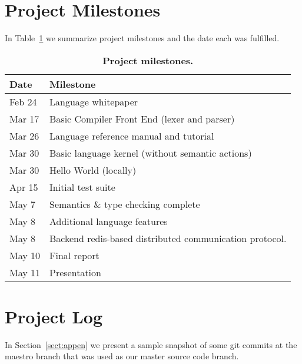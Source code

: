 \section{Project Milestones}
In Table~\ref{tab:milestones}  we summarize project milestones and the date
each was fulfilled.

\begin{table}[!h]
{%
 \begin{center}
    \begin{tabular}{ | l || l |}
    \hline
    \textbf{Date} & \textbf{Milestone}\\
    \hline
    \hline
    Feb 24 &  Language whitepaper\\ \hline
    Mar 17 &  Basic Compiler Front End (lexer and parser)\\ \hline
    Mar 26 &  Language reference manual and tutorial\\ \hline
    Mar 30 &  Basic language kernel (without semantic actions)\\ \hline
    Mar 30 &  Hello World (locally)\\ \hline
    Apr 15 &  Initial test suite \\ \hline
    May 7 &  Semantics \& type checking complete \\ \hline
    May 8 &  Additional language features \\ \hline
    May 8 &  Backend redis-based distributed communication protocol.\\ \hline
    May 10 &  Final report\\ \hline
    May 11 &  Presentation\\ \hline
    \end{tabular}
    \caption{\textbf{Project milestones.}}
    \label{tab:milestones}
 \end{center}
}
\end{table}


\section{Project Log}
In Section~\ref{sect:appen} we present a sample snapshot of some git
commits at the maestro branch that was used as our master source code branch.

